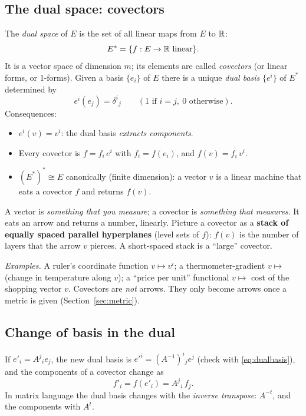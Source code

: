 \subsection{The dual space: covectors}\label{sec:dualspace}

\begin{formal}
The \emph{dual space} of $E$ is the set of all linear maps from $E$ to $\mathbb{R}$:
\[
E^*=\{f:E\to\mathbb{R}\ \text{linear}\}.
\]
It is a vector space of dimension $m$; its elements are called \emph{covectors} (or linear forms, or 1-forms). Given a basis $\{e_i\}$ of $E$ there is a unique \emph{dual basis} $\{e^{i}\}$ of $E^*$ determined by
\begin{equation}\label{eq:dualbasis}
e^{i}(e_j)=\delta^i{}_j\qquad(\text{1 if }i=j,\ 0\text{ otherwise}).
\end{equation}
Consequences:
\begin{itemize}[nosep]
\item $e^{i}(v)=v^i$: the dual basis \emph{extracts components}.
\item Every covector is $f=f_i\,e^{i}$ with $f_i=f(e_i)$, and $f(v)=f_i\,v^i$.
\item $(E^*)^*\cong E$ canonically (finite dimension): a vector $v$ is a linear machine that eats a covector $f$ and returns $f(v)$.
\end{itemize}
\end{formal}

\begin{intuition}
A vector is \emph{something that you measure}; a covector is \emph{something that measures}. It eats an arrow and returns a number, linearly. Picture a covector as a \textbf{stack of equally spaced parallel hyperplanes} (level sets of $f$): $f(v)$ is the number of layers that the arrow $v$ pierces. A short-spaced stack is a ``large'' covector.

\emph{Examples.} A ruler's coordinate function $v\mapsto v^i$; a thermometer-gradient $v\mapsto$ (change in temperature along $v$); a ``price per unit'' functional $v\mapsto$ cost of the shopping vector $v$. Covectors are \emph{not} arrows. They only become arrows once a metric is given (Section~\ref{sec:metric}).
\end{intuition}

\subsection*{Change of basis in the dual}
If $e'_i=A^j{}_ie_j$, the new dual basis is $e'^{i}=(A^{-1})^i{}_je^{j}$ (check with \eqref{eq:dualbasis}), and the components of a covector change as
\begin{equation}\label{eq:covchange}
f'_i=f(e'_i)=A^j{}_i\,f_j .
\end{equation}
In matrix language the dual basis changes with the \emph{inverse transpose}: $A^{-t}$, and the components with $A^{t}$.

